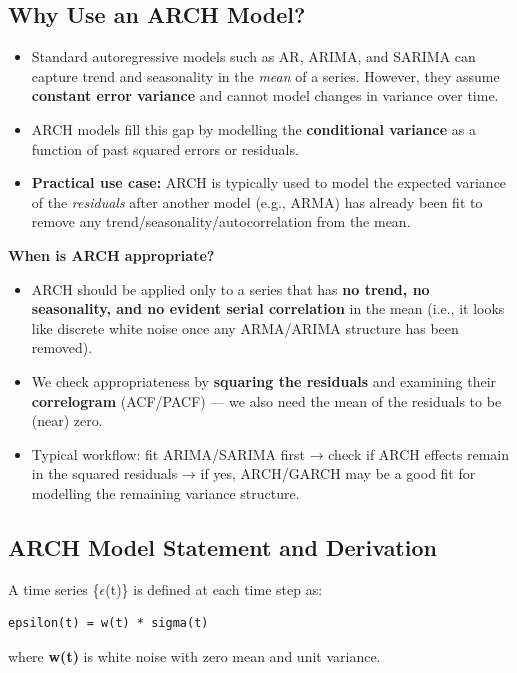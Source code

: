 \documentclass[12pt,openany]{book}
\theoremstyle{definition}
\theoremstyle{remark}
\begin{document}
\subsection{Why Use an ARCH Model?}

\begin{itemize}
\item Standard autoregressive models such as AR, ARIMA, and SARIMA can
capture trend and seasonality in the \emph{mean} of a series. However, they
assume \textbf{constant error variance} and cannot model changes in variance
over time.
\item ARCH models fill this gap by modelling the \textbf{conditional
variance} as a function of past squared errors or residuals.
\item \textbf{Practical use case:} ARCH is typically used to model the expected variance of the \emph{residuals} after another model (e.g., ARMA) has already been fit to remove any trend/seasonality/autocorrelation from the mean.
\end{itemize}

\textbf{When is ARCH appropriate?}
\begin{itemize}
\item ARCH should be applied only to a series that has \textbf{no trend, no seasonality, and no evident serial correlation} in the mean (i.e., it looks like discrete white noise once any ARMA/ARIMA structure has been removed).
\item We check appropriateness by \textbf{squaring the residuals} and examining their \textbf{correlogram} (ACF/PACF) — we also need the mean of the residuals to be (near) zero.
\item Typical workflow: fit ARIMA/SARIMA first → check if ARCH effects remain in the squared residuals → if yes, ARCH/GARCH may be a good fit for modelling the remaining variance structure.
\end{itemize}

\subsection{ARCH Model Statement and Derivation}

A time series \{\ensuremath{\epsilon}(t)\} is defined at each time step as:

\begin{lstlisting}[style=notesCode]
epsilon(t) = w(t) * sigma(t)
\end{lstlisting}

where \textbf{w(t)} is white noise with zero mean and unit variance.
\end{document}
